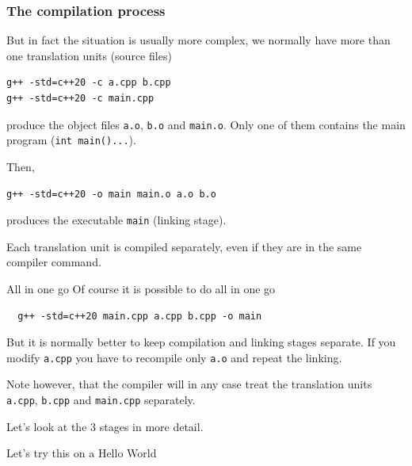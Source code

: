 \documentclass[12pt,aspectratio=169]{beamer}
\begin{document}
\begin{frame}[fragile]
  \frametitle{The compilation process}
  But in fact the situation  is usually more complex, \alert{we normally have more than one translation units (source files)}

\begin{verbatim}
g++ -std=c++20 -c a.cpp b.cpp 
g++ -std=c++20 -c main.cpp
\end{verbatim}

  produce the \alert{object files} \texttt{a.o}, \texttt{b.o} and
  \texttt{main.o}. Only one of them contains the \alert{main program}
  (\texttt{int main(){...}}).

  Then,
\begin{verbatim}
g++ -std=c++20 -o main main.o a.o b.o
\end{verbatim}
  produces the \alert{executable} \texttt{main} (linking stage).
  \smallskip
  
  Each translation unit \alert{is compiled separately, even if they are
    in the same compiler command}.
\end{frame}

\begin{frame}[fragile]{All in one go}
	Of course it is possible to do all in one go
  \begin{verbatim}
  g++ -std=c++20 main.cpp a.cpp b.cpp -o main
  \end{verbatim}	
  But it is normally better to keep compilation and linking stages separate. If you modify \texttt{a.cpp} you have
  to recompile only \texttt{a.o} and repeat the linking.
  \smallskip

  Note however, that the compiler will in any case treat the translation units \texttt{a.cpp}, \texttt{b.cpp} and \texttt{main.cpp} separately.


  \medskip

  Let's look at the 3 stages in more detail.
\end{frame}

\begin{frame}
  \centering
  \Large
  \color{blue} Let's try this on a Hello World
\end{frame}
 
\end{document}
